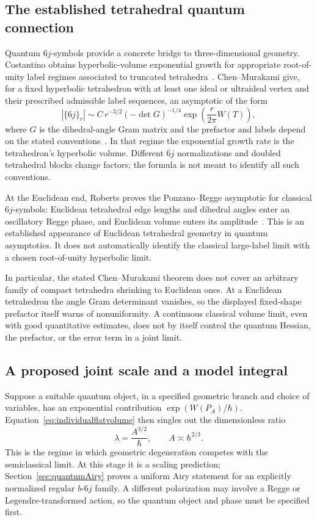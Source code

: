 \documentclass[11pt,a4paper]{article}
\numberwithin{equation}{section}
\theoremstyle{definition}
\theoremstyle{remark}
\begin{document}
\subsection{The established tetrahedral quantum connection}

Quantum $6j$-symbols provide a concrete bridge to three-dimensional
geometry. Costantino obtains hyperbolic-volume exponential growth
for appropriate root-of-unity label regimes associated to truncated
tetrahedra~\cite{Costantino}. Chen--Murakami give, for a fixed
hyperbolic tetrahedron with at least one ideal or ultraideal vertex
and their prescribed admissible label sequences, an asymptotic of
the form
\begin{equation}
 |\{6j\}_r|\sim C\,r^{-3/2}(-\det G)^{-1/4}
                 \exp\left(\frac{r}{2\pi}W(T)\right),
 \label{eq:quantum6jstructure}
\end{equation}
where $G$ is the dihedral-angle Gram matrix and the prefactor and
labels depend on the stated conventions~\cite{ChenMurakami}.
In that regime the exponential growth rate is the tetrahedron's
hyperbolic volume. Different $6j$ normalizations and doubled
tetrahedral blocks change factors; the formula is not meant to
identify all such conventions.

At the Euclidean end, Roberts proves the Ponzano--Regge asymptotic
for classical $6j$-symbols: Euclidean tetrahedral edge lengths and
dihedral angles enter an oscillatory Regge phase, and Euclidean
volume enters its amplitude~\cite{Roberts}. This is an established
appearance of Euclidean tetrahedral geometry in quantum
asymptotics. It does not automatically identify the classical
large-label limit with a chosen root-of-unity hyperbolic limit.

In particular, the stated Chen--Murakami theorem does not cover
an arbitrary family of compact tetrahedra shrinking to Euclidean
ones. At a Euclidean tetrahedron the angle Gram determinant
vanishes, so the displayed fixed-shape prefactor itself warns of
nonuniformity. A continuous classical volume limit, even with
good quantitative estimates, does not by itself control the
quantum Hessian, the prefactor, or the error term in a joint limit.

\subsection{A proposed joint scale and a model integral}

Suppose a suitable quantum object, in a specified geometric branch
and choice of variables, has an exponential contribution
$\exp(W(P_A)/\hbar)$. Equation~\eqref{eq:individualflatvolume}
then singles out the dimensionless ratio
\begin{equation}
 \lambda=\frac{A^{3/2}}{\hbar},\qquad
 A\asymp\hbar^{2/3}.
 \label{eq:jointscale}
\end{equation}
This is the regime in which geometric degeneration competes
with the semiclassical limit. At this stage it is a scaling prediction;
Section~\ref{sec:quantumAiry} proves a uniform Airy statement for an
explicitly normalized regular $b$-$6j$ family. A different
polarization may involve a Regge or Legendre-transformed action,
so the quantum object and phase must be specified first.
\end{document}
